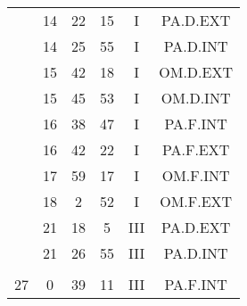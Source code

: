 \documentclass[12pt, a4paper]{article}
\begin{document}
\begin{multicols}{3}
{\begin{tabular}{c c c c c c}
	 	 	 	 & 14 & 22 & 15 & I & PA.D.EXT\\%
	 	 	 	 & 14 & 25 & 55 & I & PA.D.INT\\%
	 	 	 	 & 15 & 42 & 18 & I & OM.D.EXT\\%
	 	 	 	 & 15 & 45 & 53 & I & OM.D.INT\\%
	 	 	 	 & 16 & 38 & 47 & I & PA.F.INT\\%
	 	 	 	 & 16 & 42 & 22 & I & PA.F.EXT\\%
	 	 	 	 & 17 & 59 & 17 & I & OM.F.INT\\%
	 	 	 	 & 18 & 2 & 52 & I & OM.F.EXT\\%
	 	 	 	 & 21 & 18 & 5 & III & PA.D.EXT\\%
	 	 	 	 & 21 & 26 & 55 & III & PA.D.INT\\%
	 	 	 	 & & & & & \\%
	 	 	 	27 & 0 & 39 & 11 & III & PA.F.INT\\%
	 	 \end{tabular}
 	}
\end{multicols}
\end{document}
